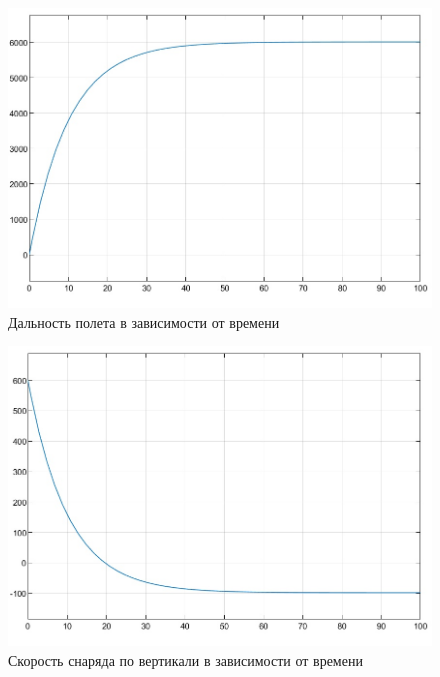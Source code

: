 \documentclass{article}
\begin{document}
	\begin{figure}[H]
		\centering
		\includegraphics[width=0.7\linewidth]{graphx}
		\caption{Дальность полета в зависимости от времени}
		\label{fig:graphx}
	\end{figure}
	\begin{figure}[H]
		\centering
		\includegraphics[width=0.7\linewidth]{graphvy}
		\caption{Скорость снаряда по вертикали в зависимости от времени}
		\label{fig:graphvy}
	\end{figure}
\end{document}
